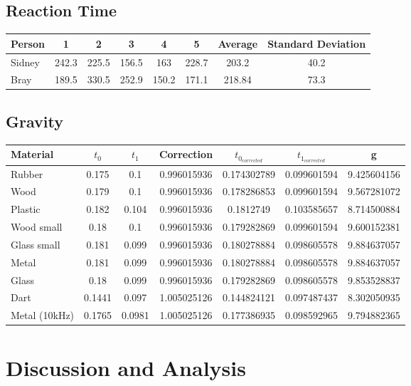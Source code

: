 \documentclass[fleqn,14pt]{article}
\begin{document}
\subsection{Reaction Time}

\vspace{0.5cm}
\begin{tabular}{l|ccccc|cc}
  Person & 1 & 2 & 3 & 4 & 5 & Average & Standard Deviation\\
  \midrule
  Sidney & 242.3 & 225.5 & 156.5 & 163 & 228.7 & 203.2 & 40.2\\
  Bray & 189.5 & 330.5 & 252.9 & 150.2 & 171.1 & 218.84 & 73.3\\
\end{tabular}
\vspace{0.5cm}

\subsection{Gravity}

\begin{tabular}{lcccccc}
  Material & $t_0$ & $t_1$ & Correction & $t_{0_{corrected}}$ & $t_{1_{corrected}}$ & g\\
  \midrule
  Rubber & 0.175 & 0.1 & 0.996015936 & 0.174302789 & 0.099601594 & 9.425604156\\
  Wood & 0.179 & 0.1 & 0.996015936 & 0.178286853 & 0.099601594 & 9.567281072\\
  Plastic & 0.182 & 0.104 & 0.996015936 & 0.1812749 & 0.103585657 & 8.714500884\\
  Wood small & 0.18 & 0.1 & 0.996015936 & 0.179282869 & 0.099601594 & 9.600152381\\
  Glass small & 0.181 & 0.099 & 0.996015936 & 0.180278884 & 0.098605578 & 9.884637057\\
  Metal & 0.181 & 0.099 & 0.996015936 & 0.180278884 & 0.098605578 & 9.884637057\\
  Glass  & 0.18 & 0.099 & 0.996015936 & 0.179282869 & 0.098605578 & 9.853528837\\
  Dart & 0.1441 & 0.097 & 1.005025126 & 0.144824121 & 0.097487437 & 8.302050935\\
  Metal (10kHz)& 0.1765 & 0.0981 & 1.005025126 & 0.177386935 & 0.098592965 & 9.794882365\\

\end{tabular}
\vspace{0.5cm}


\section{Discussion and Analysis}
\end{document}
